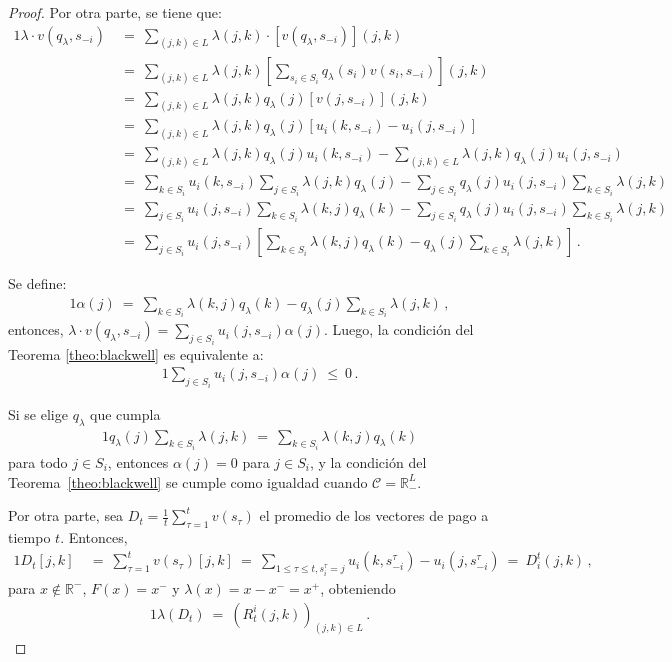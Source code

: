 \begin{proof}
Por otra parte, se tiene que:
\begin{alignat}{1}
	\lambda \cdot v(q_{\lambda}, s_{-i})\ 
	  &=\ \sum_{(j,k) \in L} \lambda(j,k) \cdot [v(q_{\lambda}, s_{-i})](j, k) \\
	&=\ \sum_{(j,k) \in L} \lambda(j, k)\left[\sum_{s_i \in S_i} q_{\lambda}(s_i) v(s_i, s_{-i}) \right](j, k) \\
	&=\ \sum_{(j,k) \in L} \lambda(j, k) q_{\lambda}(j) [v(j, s_{-i})](j, k) \\
	&=\ \sum_{(j,k) \in L} \lambda(j, k) q_{\lambda}(j) [u_i(k, s_{-i}) - u_i(j, s_{-i})] \\
	&=\ \sum_{(j,k) \in L} \lambda(j, k) q_{\lambda}(j)u_i(k, s_{-i}) - \sum_{(j,k) \in L} \lambda(j, k) q_{\lambda}(j)u_i(j, s_{-i}) \\
	&=\ \sum_{k \in S_i} u_i(k, s_{-i}) \sum_{j \in S_i} \lambda(j, k) q_{\lambda}(j) - \sum_{j \in S_i} q_{\lambda}(j)u_i(j, s_{-i}) \sum_{k \in S_i} \lambda(j, k) \\
	&=\ \sum_{j \in S_i} u_i(j, s_{-i}) \sum_{k \in S_i} \lambda(k, j) q_{\lambda}(k) - \sum_{j \in S_i} q_{\lambda}(j)u_i(j, s_{-i}) \sum_{k \in S_i} \lambda(j, k) \\
	&=\ \sum_{j \in S_i} u_i(j, s_{-i}) \left[ \sum_{k \in S_i} \lambda(k, j) q_{\lambda}(k) - q_{\lambda}(j) \sum_{k \in S_i} \lambda(j, k) \right] \,.
\end{alignat}

Se define:
\begin{alignat}{1}
  \alpha(j)\ =\ \sum_{k \in S_i} \lambda(k, j) q_{\lambda}(k) - q_{\lambda}(j) \sum_{k \in S_i} \lambda(j, k) \,,
\end{alignat}
entonces, $\lambda \cdot v(q_{\lambda}, s_{-i}) = \sum_{j \in S_i} u_i(j, s_{-i}) \alpha(j)$. Luego, la condición del Teorema \ref{theo:blackwell} es equivalente a:
\begin{alignat}{1}
	\sum_{j \in S_i} u_i(j, s_{-i}) \alpha(j)\ \leq\ 0 \,.
\end{alignat}

Si se elige $q_{\lambda}$ que cumpla 
\begin{alignat}{1}
  q_{\lambda}(j) \sum_{k \in S_i} \lambda(j, k)\ =\ \sum_{k \in S_i} \lambda(k, j) q_{\lambda}(k)
\end{alignat}
para todo $j \in S_i$, entonces $\alpha(j)=0$ para $j\in S_i$, y la condición del Teorema~\ref{theo:blackwell} se cumple como igualdad cuando $\mathcal{C} = \mathbb{R}^{L}_-$.

Por otra parte, sea $D_t=\frac{1}{t}\sum_{\tau=1}^t v(s_\tau)$ el promedio de los vectores de pago a tiempo $t$. Entonces,
\begin{alignat}{1}
  D_t[j, k]\ &=\ \sum_{\tau=1}^{t} v(s_{\tau})[j,k]\
	=\ \sum_{1\leq\tau \leq t, s_i^{\tau} = j} u_i(k, s_{-i}^{\tau}) - u_i(j, s_{-i}^{\tau})\
	=\ D_i^t(j, k) \,,
\end{alignat}
para $x \notin \mathbb{R}^-$, $F(x) = x^-$ y $\lambda (x) = x - x^- = x^+$, obteniendo 
\begin{alignat}{1}
	\lambda(D_t)\ =\ (R_t^i(j, k))_{(j, k) \in L} \,.
\end{alignat}


\end{proof}
